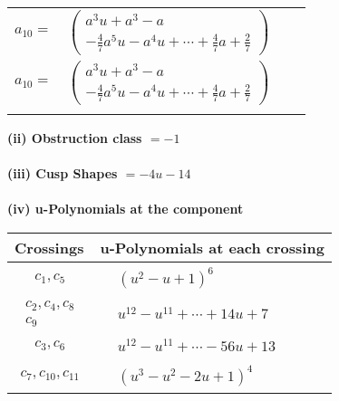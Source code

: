 \documentclass[1p]{elsarticle_modified}
\theoremstyle{definition}
\begin{document}
\begin{tabular}{m{7pt} m{180pt} m{7pt} m{180pt} }
\flushright $a_{10}=$&$\begin{pmatrix}a^3 u+a^3- a\\-\frac{4}{7} a^5 u- a^4 u+\cdots+\frac{4}{7} a+\frac{2}{7}\end{pmatrix}$\\ \flushright $a_{10}=$&$\begin{pmatrix}a^3 u+a^3- a\\-\frac{4}{7} a^5 u- a^4 u+\cdots+\frac{4}{7} a+\frac{2}{7}\end{pmatrix}$\\&\end{tabular}
\flushleft \textbf{(ii) Obstruction class $= -1$}\\~\\
\flushleft \textbf{(iii) Cusp Shapes $= -4 u-14$}\\~\\
\newpage\renewcommand{\arraystretch}{1}
\flushleft \textbf{(iv) u-Polynomials at the component}\newline \\
\begin{tabular}{m{50pt}|m{274pt}}
Crossings & \hspace{64pt}u-Polynomials at each crossing \\
\hline $$\begin{aligned}c_{1},c_{5}\end{aligned}$$&$\begin{aligned}
&(u^2- u+1)^6
\end{aligned}$\\
\hline $$\begin{aligned}c_{2},c_{4},c_{8}\\c_{9}\end{aligned}$$&$\begin{aligned}
&u^{12}- u^{11}+\cdots+14 u+7
\end{aligned}$\\
\hline $$\begin{aligned}c_{3},c_{6}\end{aligned}$$&$\begin{aligned}
&u^{12}- u^{11}+\cdots-56 u+13
\end{aligned}$\\
\hline $$\begin{aligned}c_{7},c_{10},c_{11}\end{aligned}$$&$\begin{aligned}
&(u^3- u^2-2 u+1)^4
\end{aligned}$\\
\hline
\end{tabular}\\~\\
\end{document}
